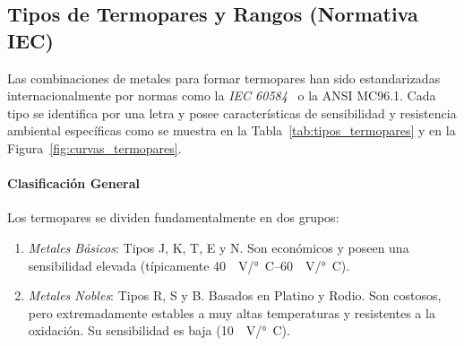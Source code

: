 
\subsection{Tipos de Termopares y Rangos (Normativa IEC)}

Las combinaciones de metales para formar termopares han sido estandarizadas internacionalmente por normas como la \emph{IEC 60584}~\cite{iec60584_1_2013} o la ANSI MC96.1. Cada tipo se identifica por una letra y posee características de sensibilidad y resistencia ambiental específicas como se muestra en la Tabla~\ref{tab:tipos_termopares} y en la Figura~\ref{fig:curvas_termopares}.

\paragraph{Clasificación General}
Los termopares se dividen fundamentalmente en dos grupos:
\begin{enumerate}
    \item \emph{Metales Básicos}: Tipos J, K, T, E y N. Son económicos y poseen una sensibilidad elevada (típicamente \qtyrange{40}{60}{\mu V/\degree C}).
    \item \emph{Metales Nobles}: Tipos R, S y B. Basados en Platino y Rodio. Son costosos, pero extremadamente estables a muy altas temperaturas y resistentes a la oxidación. Su sensibilidad es baja (\qty{10}{\mu V/\degree C}).
\end{enumerate}

